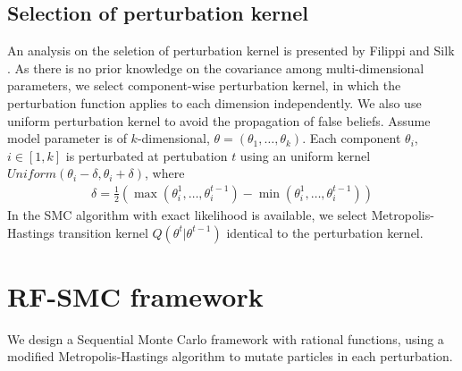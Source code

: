 \subsection{Selection of perturbation kernel}
An analysis on the seletion of perturbation kernel is presented by Filippi
\cite{filippi2013optimality} and Silk \cite{silk2012optimizing}. As there is no prior knowledge on
the covariance among multi-dimensional parameters, we select component-wise perturbation kernel, in
which the perturbation function applies to each dimension independently. We also use uniform
perturbation kernel to avoid the propagation of false beliefs. Assume model parameter is of
$k$-dimensional, $\theta=(\theta_1,\ldots,\theta_k)$. Each component $\theta_i$, $i\in [1,k]$ is
perturbated at pertubation $t$ using an uniform kernel $Uniform(\theta_i-\delta, \theta_i+\delta)$, where
\begin{align*}
    \delta = \frac{1}{2}(\max(\theta^1_i,\ldots,\theta^{t-1}_i) - \min(\theta^1_i,\ldots,\theta^{t-1}_i))
\end{align*}
In the SMC algorithm with exact likelihood is available, we select Metropolis-Hastings transition
kernel $Q(\theta^t|\theta^{t-1})$ identical to the perturbation kernel.

\section{RF-SMC framework}
We design a Sequential Monte Carlo framework with rational functions, using a modified
Metropolis-Hastings algorithm to mutate particles in each perturbation.

